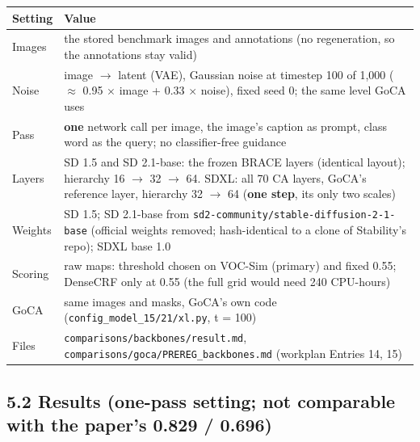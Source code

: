 \documentclass[
  10pt,
]{article}
\newcounter{none} %
\begin{document}
{\def\LTcaptype{none} %
\begin{longtable}[]{@{}
  >{\raggedright\arraybackslash}p{}
  >{\raggedright\arraybackslash}p{}@{}}
\toprule\noalign{}
\begin{minipage}[b]{\linewidth}\raggedright
Setting
\end{minipage} & \begin{minipage}[b]{\linewidth}\raggedright
Value
\end{minipage} \\
\midrule\noalign{}
\endhead
\bottomrule\noalign{}
\endlastfoot
Images & the stored benchmark images and annotations (no regeneration,
so the annotations stay valid) \\
Noise & image \ensuremath{\rightarrow} latent (VAE), Gaussian noise at timestep 100 of 1,000 (\ensuremath{\approx}
0.95 \ensuremath{\times} image + 0.33 \ensuremath{\times} noise), fixed seed 0; the same level GoCA uses \\
Pass & \textbf{one} network call per image, the image's caption as
prompt, class word as the query; no classifier-free guidance \\
Layers & SD 1.5 and SD 2.1-base: the frozen BRACE layers (identical
layout); hierarchy 16 \ensuremath{\rightarrow} 32 \ensuremath{\rightarrow} 64. SDXL: all 70 CA layers, GoCA's
reference layer, hierarchy 32 \ensuremath{\rightarrow} 64 (\textbf{one step}, its only two
scales) \\
Weights & SD 1.5; SD 2.1-base from
\texttt{sd2-community/stable-diffusion-2-1-base} (official weights
removed; hash-identical to a clone of Stability's repo); SDXL base
1.0 \\
Scoring & raw maps: threshold chosen on VOC-Sim (primary) and fixed
0.55; DenseCRF only at 0.55 (the full grid would need 240 CPU-hours) \\
GoCA & same images and masks, GoCA's own code
(\texttt{config\_model\_15/21/xl.py}, t = 100) \\
Files & \texttt{comparisons/backbones/result.md},
\texttt{comparisons/goca/PREREG\_backbones.md} (workplan Entries 14,
15) \\
\end{longtable}
}

\subsection{5.2 Results (one-pass setting; not comparable with the
paper's 0.829 / 0.696)}
\end{document}
